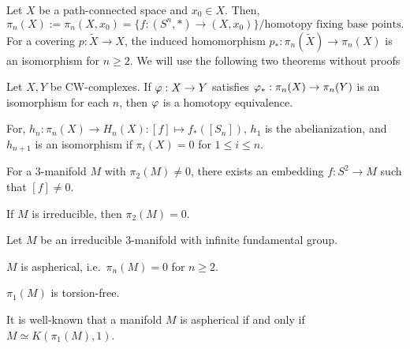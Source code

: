 \documentclass{../../small}
\begin{document}
Let $X$ be a path-connected space and $x_0\in X$.
Then,
\[\pi_n(X):=\pi_n(X,x_0)=\{f:(S^n,*)\to (X,x_0)\}/\text{homotopy fixing base points}.\]
For a covering $p:\tilde X\to X$, the induced homomorphism $p_*:\pi_n(\tilde X)\to\pi_n(X)$ is an isomorphism for $n\ge2$.
We will use the following two theorems without proofs
\begin{thm*}
Let $X,Y$ be CW-complexes.
If $\varphi:X\to Y$ satisfies $\varphi_*:\pi_n(X)\to\pi_n(Y)$ is an isomorphism for each $n$, then $\varphi$ is a homotopy equivalence.
\end{thm*}
\begin{thm*}
For, $h_n:\pi_n(X)\to H_n(X):[f]\mapsto f_*([S_n])$, $h_1$ is the abelianization, and $h_{n+1}$ is an isomorphism if $\pi_i(X)=0$ for $1\le i\le n$.
\end{thm*}
\setcounter{thm}{3}
\begin{thm}
For a 3-manifold $M$ with $\pi_2(M)\ne0$, there exists an embedding $f:S^2\to M$ such that $[f]\ne0$.
\end{thm}
\begin{cor}
If $M$ is irreducible, then $\pi_2(M)=0$.
\end{cor}
\begin{thm}
Let $M$ be an irreducible 3-manifold with infinite fundamental group.
\begin{parts}
\item $M$ is aspherical, i.e.~$\pi_n(M)=0$ for $n\ge2$.
\item $\pi_1(M)$ is torsion-free.
\end{parts}
It is well-known that a manifold $M$ is aspherical if and only if $M\simeq K(\pi_1(M),1)$.
\end{thm}
\end{document}
